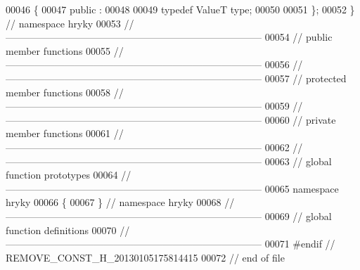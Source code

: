 \begin{DoxyCode}
00046 \{
00047 \textcolor{keyword}{public} :
00048 
00049     \textcolor{keyword}{typedef} ValueT type;
00050 
00051 \};
00052 \} \textcolor{comment}{// namespace hryky}
00053 \textcolor{comment}{//
      ------------------------------------------------------------------------------}
00054 \textcolor{comment}{// public member functions}
00055 \textcolor{comment}{//
      ------------------------------------------------------------------------------}
00056 \textcolor{comment}{//
      ------------------------------------------------------------------------------}
00057 \textcolor{comment}{// protected member functions}
00058 \textcolor{comment}{//
      ------------------------------------------------------------------------------}
00059 \textcolor{comment}{//
      ------------------------------------------------------------------------------}
00060 \textcolor{comment}{// private member functions}
00061 \textcolor{comment}{//
      ------------------------------------------------------------------------------}
00062 \textcolor{comment}{//
      ------------------------------------------------------------------------------}
00063 \textcolor{comment}{// global function prototypes}
00064 \textcolor{comment}{//
      ------------------------------------------------------------------------------}
00065 \textcolor{keyword}{namespace }hryky
00066 \{
00067 \} \textcolor{comment}{// namespace hryky}
00068 \textcolor{comment}{//
      ------------------------------------------------------------------------------}
00069 \textcolor{comment}{// global function definitions}
00070 \textcolor{comment}{//
      ------------------------------------------------------------------------------}
00071 \textcolor{preprocessor}{#endif // REMOVE\_CONST\_H\_20130105175814415}
00072 \textcolor{preprocessor}{}\textcolor{comment}{// end of file}
\end{DoxyCode}
